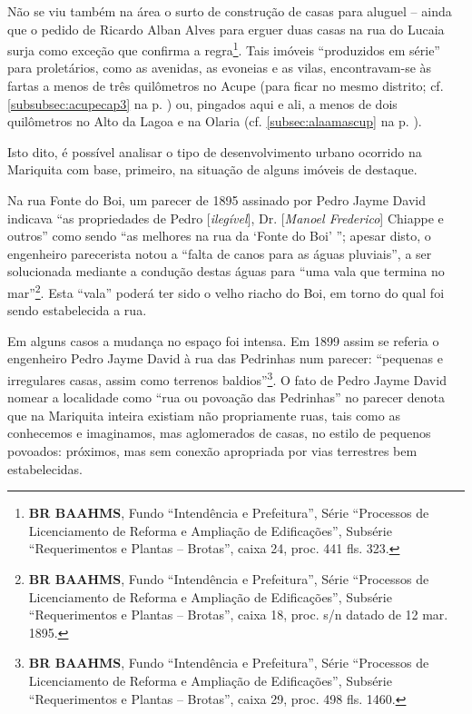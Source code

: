 Não se viu também na área o surto de construção de casas para aluguel -- ainda que o pedido de Ricardo Alban Alves para erguer duas casas na rua do Lucaia surja como exceção que confirma a regra\footnote{\textbf{BR BAAHMS}, Fundo ``Intendência e Prefeitura'', Série ``Processos de Licenciamento de Reforma e Ampliação de Edificações'', Subsérie ``Requerimentos e Plantas -- Brotas'', caixa 24, proc. 441 fls. 323.}. Tais imóveis ``produzidos em série'' para proletários, como as avenidas, as evoneias e as vilas, encontravam-se às fartas a menos de três quilômetros no Acupe (para ficar no mesmo distrito; cf. \autoref{subsubsec:acupecap3} na p. \pageref{subsubsec:acupecap3}) ou, pingados aqui e ali, a menos de dois quilômetros no Alto da Lagoa e na Olaria (cf. \autoref{subsec:alaamascup} na p. \pageref{subsec:alaamascup}). 


Isto dito, é possível analisar o tipo de desenvolvimento urbano ocorrido na Mariquita com base, primeiro, na situação de alguns imóveis de destaque.

Na rua Fonte do Boi, um parecer de 1895 assinado por Pedro Jayme David indicava ``as propriedades de Pedro [\textit{ilegível}], Dr. [\textit{Manoel Frederico}] Chiappe e outros'' como sendo ``as melhores na rua da `Fonte do Boi' ''; apesar disto, o engenheiro parecerista notou a ``falta de canos para as águas pluviais'', a ser solucionada mediante a condução destas águas para ``uma vala que termina no mar''\footnote{\textbf{BR BAAHMS}, Fundo ``Intendência e Prefeitura'', Série ``Processos de Licenciamento de Reforma e Ampliação de Edificações'', Subsérie ``Requerimentos e Plantas -- Brotas'', caixa 18, proc. s/n datado de 12 mar. 1895.}. Esta ``vala'' poderá ter sido o velho riacho do Boi, em torno do qual foi sendo estabelecida a rua.

Em alguns casos a mudança no espaço foi intensa. Em 1899 assim se referia o engenheiro Pedro Jayme David à rua das Pedrinhas num parecer: ``pequenas e irregulares casas, assim como terrenos baldios''\footnote{\textbf{BR BAAHMS}, Fundo ``Intendência e Prefeitura'', Série ``Processos de Licenciamento de Reforma e Ampliação de Edificações'', Subsérie ``Requerimentos e Plantas -- Brotas'', caixa 29, proc. 498 fls. 1460.}. O fato de Pedro Jayme David nomear a localidade como ``rua ou povoação das Pedrinhas'' no parecer denota que na Mariquita inteira existiam não propriamente ruas, tais como as conhecemos e imaginamos, mas aglomerados de casas, no estilo de pequenos povoados: próximos, mas sem conexão apropriada por vias terrestres bem estabelecidas.

